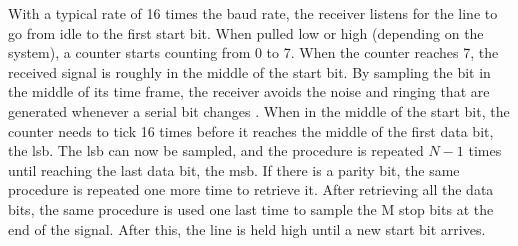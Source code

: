 \documentclass[main.tex]{subfiles}
\begin{document}
With a typical rate of 16 times the baud rate, the receiver listens for the line to go from idle to the first start bit. When pulled low or high (depending on the system), a counter starts counting from 0 to 7. When the counter reaches 7, the received signal is roughly in the middle of the start bit. By sampling the bit in the middle of its time frame, the receiver avoids the noise and ringing that are generated whenever a serial bit changes \cite{rapid08}. When in the middle of the start bit, the counter needs to tick 16 times before it reaches the middle of the first data bit, the \gls{lsb}. The \gls{lsb} can now be sampled, and the procedure is repeated $N - 1$ times until reaching the last data bit, the \acrshort{msb}. If there is a parity bit, the same procedure is repeated one more time to retrieve it. After retrieving all the data bits, the same procedure is used one last time to sample the M stop bits at the end of the signal. After this, the line is held high until a new start bit arrives. 

\end{document}
